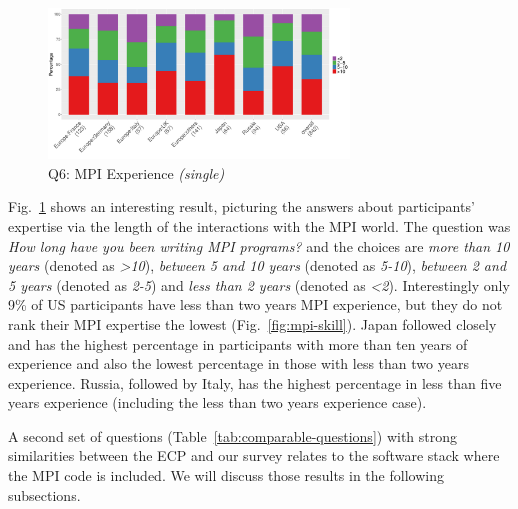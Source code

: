 \documentclass[preprint,5p,times]{elsarticle}
\def\myquote#1{{\it #1}}
\newcommand{\revision}[2]{{\color{blue}#2}}
\begin{document}
\begin{figure}[tb]
  \begin{center}
    \includegraphics[width=8.0cm]{R-scripts/Q6.pdf}
    \caption{Q6: MPI Experience {\it(single)}}
    \label{fig:mpi-experience}
\vspace{-3mm}%
  \end{center}
\end{figure}

Fig.~\ref{fig:mpi-experience} shows an interesting result, picturing the answers
about participants' expertise via the length of the interactions with the MPI
world. The question was {\it How long have you been writing MPI programs?} and
the choices are {\it more than 10 years} (denoted as \myquote{\textgreater 10}),
\myquote{between 5 and 10 years} (denoted as \myquote{5-10}), \myquote{between 2
and 5 years} (denoted as \myquote{2-5}) and \myquote{less than 2 years} (denoted
as \myquote{\textless 2}). Interestingly only 9\% of US participants have less
than \revision{2}{two} years MPI experience, but they do
\revision{no}{not} rank their MPI expertise the lowest 
(Fig.~\ref {fig:mpi-skill}). Japan followed closely \revision{}{and} has the highest percentage
in participants with more than \revision{10}{ten} years of experience
and also the lowest 
percentage in those with less than \revision{2}{two} years experience. Russia, followed by
Italy, has the highest percentage in less than \revision{5}{five} years experience (including the
less than \revision{2}{two} years experience case).

A second set of questions (Table~\ref{tab:comparable-questions}) with strong
similarities between the ECP and our survey relates to the software stack where
the MPI code is included. We will discuss those results in the following
subsections.
\end{document}
